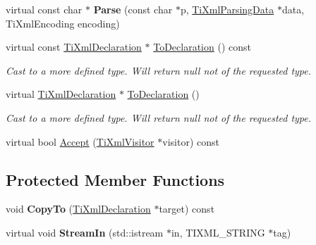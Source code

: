 \begin{DoxyCompactItemize}
\item 
\mbox{\label{class_ti_xml_declaration_a9839ea97ed687a2b7342fd7b0f04361b}} 
virtual const char $\ast$ {\bfseries Parse} (const char $\ast$p, \hyperlink{class_ti_xml_parsing_data}{Ti\+Xml\+Parsing\+Data} $\ast$data, Ti\+Xml\+Encoding encoding)
\item 
\mbox{\label{class_ti_xml_declaration_aab62703b620d9b9391b482dc1835ecf6}} 
virtual const \hyperlink{class_ti_xml_declaration}{Ti\+Xml\+Declaration} $\ast$ \hyperlink{class_ti_xml_declaration_aab62703b620d9b9391b482dc1835ecf6}{To\+Declaration} () const
\begin{DoxyCompactList}\small\item\em Cast to a more defined type. Will return null not of the requested type. \end{DoxyCompactList}\item 
\mbox{\label{class_ti_xml_declaration_a6bd3d1daddcaeb9543c24bfd090969ce}} 
virtual \hyperlink{class_ti_xml_declaration}{Ti\+Xml\+Declaration} $\ast$ \hyperlink{class_ti_xml_declaration_a6bd3d1daddcaeb9543c24bfd090969ce}{To\+Declaration} ()
\begin{DoxyCompactList}\small\item\em Cast to a more defined type. Will return null not of the requested type. \end{DoxyCompactList}\item 
virtual bool \hyperlink{class_ti_xml_declaration_aa1b6bade6c989407ce9881bdfc73c1e6}{Accept} (\hyperlink{class_ti_xml_visitor}{Ti\+Xml\+Visitor} $\ast$visitor) const
\end{DoxyCompactItemize}
\subsection*{Protected Member Functions}
\begin{DoxyCompactItemize}
\item 
\mbox{\label{class_ti_xml_declaration_a189de17b3e04d4e5b1c385336f214af1}} 
void {\bfseries Copy\+To} (\hyperlink{class_ti_xml_declaration}{Ti\+Xml\+Declaration} $\ast$target) const
\item 
\mbox{\label{class_ti_xml_declaration_af90df1c54c89b0f8dd56168419967610}} 
virtual void {\bfseries Stream\+In} (std\+::istream $\ast$in, T\+I\+X\+M\+L\+\_\+\+S\+T\+R\+I\+NG $\ast$tag)
\end{DoxyCompactItemize}
